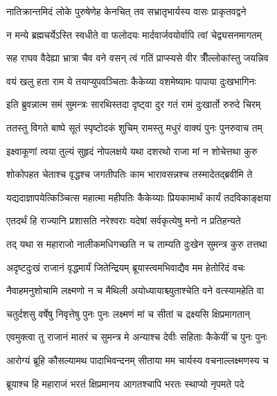 \twolineshloka
{नातिक्रान्तमिदं लोके पुरुषेणेह केनचित्}
{तव सभ्रातृभार्यस्य वासः प्राकृतवद्वने} %

\twolineshloka
{न मन्ये ब्रह्मचर्येऽस्ति स्वधीते वा फलोदयः}
{मार्दवार्जवयोर्वापि त्वां चेद्व्यसनमागतम्} %

\twolineshloka
{सह राघव वैदेह्या भ्रात्रा चैव वने वसन्}
{त्वं गतिं प्राप्स्यसे वीर त्रीँल्लोकांस्तु जयन्निव} %

\twolineshloka
{वयं खलु हता राम ये तयाप्युपवञ्चिताः}
{कैकेय्या वशमेष्यामः पापाया दुःखभागिनः} %

\twolineshloka
{इति ब्रुवन्नात्म समं सुमन्त्रः सारथिस्तदा}
{दृष्ट्वा दुर गतं रामं दुःखार्तो रुरुदे चिरम्} %

\twolineshloka
{ततस्तु विगते बाष्पे सूतं स्पृष्टोदकं शुचिम्}
{रामस्तु मधुरं वाक्यं पुनः पुनरुवाच तम्} %

\twolineshloka
{इक्ष्वाकूणां त्वया तुल्यं सुहृदं नोपलक्षये}
{यथा दशरथो राजा मां न शोचेत्तथा कुरु} %

\twolineshloka
{शोकोपहत चेताश्च वृद्धश्च जगतीपतिः}
{काम भारावसन्नश्च तस्मादेतद्ब्रवीमि ते} %

\twolineshloka
{यद्यदाज्ञापयेत्किञ्चित्स महात्मा महीपतिः}
{कैकेय्याः प्रियकामार्थं कार्यं तदविकाङ्क्षया} %

\twolineshloka
{एतदर्थं हि राज्यानि प्रशासति नरेश्वराः}
{यदेषां सर्वकृत्येषु मनो न प्रतिहन्यते} %

\twolineshloka
{तद् यथा स महाराजो नालीकमधिगच्छति}
{न च ताम्यति दुःखेन सुमन्त्र कुरु तत्तथा} %

\twolineshloka
{अदृष्टदुःखं राजानं वृद्धमार्यं जितेन्द्रियम्}
{ब्रूयास्त्वमभिवाद्यैव मम हेतोरिदं वचः} %

\twolineshloka
{नैवाहमनुशोचामि लक्ष्मणो न च मैथिली}
{अयोध्यायाश्च्युताश्चेति वने वत्स्यामहेति वा} %

\twolineshloka
{चतुर्दशसु वर्षेषु निवृत्तेषु पुनः पुनः}
{लक्ष्मणं मां च सीतां च द्रक्ष्यसि क्षिप्रमागतान्} %

\twolineshloka
{एवमुक्त्वा तु राजानं मातरं च सुमन्त्र मे}
{अन्याश्च देवीः सहिताः कैकेयीं च पुनः पुनः} %

\twolineshloka
{आरोग्यं ब्रूहि कौसल्यामथ पादाभिवन्दनम्}
{सीताया मम चार्यस्य वचनाल्लक्ष्मणस्य च} %

\twolineshloka
{ब्रूयाश्च हि महाराजं भरतं क्षिप्रमानय}
{आगतश्चापि भरतः स्थाप्यो नृपमते पदे} %

